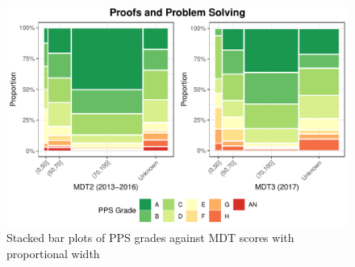\documentclass[a4paper]{report}
\begin{document}
\begin{figure}[H]
  \centering
  \includegraphics[width=\linewidth]{fig/REL_PPSGrade_vs_MDT.pdf}
  \caption{\label{fig:REL_PPSGrade_vs_MDT}Stacked bar plots of PPS grades against MDT scores with proportional width}
\end{figure}
\end{document}
